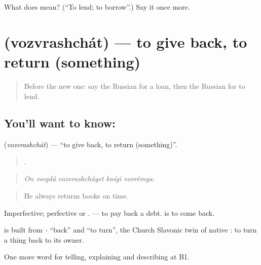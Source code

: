 \begin{tcolorbox}[breakable,colback=teal!4,colframe=teal!35!black,title={Before you move on}]
What does  mean? (\textquotedblleft{}To lend; to borrow\textquotedblright{}.) Say it once more.
\end{tcolorbox}
\section[\texorpdfstring{\ru{возвращать} (vozvrashchát)}{возвращать (vozvrashchát)}]{ (vozvrashchát) — to give back, to return (something)}

\label{lesson:RU-C394-vozvrashchat}



\begin{quote}
Before the new one: say the Russian for a loan, then the Russian for to lend.
\end{quote}

\subsection*{You'll want to know: }
\textbf{} (\emph{vozvrashchát}) — \textquotedblleft{}to give back, to return (something)\textquotedblright{}.

\begin{quote}
    .
\end{quote}

\begin{quote}
\emph{On vsegdá vozvrashcháyet knígi vovrémya.}
\end{quote}

\begin{quote}
He always returns books on time.
\end{quote}

Imperfective; perfective \emph{} or \emph{}. \emph{ } — to pay back a debt. \emph{} is to come back.

\begin{cousinweb}
\textbf{} is built from \emph{-} \textquotedblleft{}back\textquotedblright{} and \emph{} \textquotedblleft{}to turn\textquotedblright{}, the Church Slavonic twin of native \emph{}: to turn a thing back to its owner.
\end{cousinweb}

\begin{grammarlens}[title={What you've built}]
One more word for telling, explaining and describing at B1.
\end{grammarlens}

